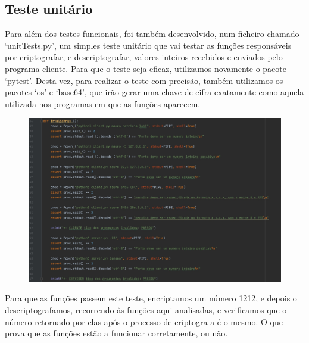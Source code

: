 \documentclass{report}
\begin{document}
\subsection{Teste unitário}
Para além dos testes funcionais, foi também desenvolvido, num ficheiro chamado ‘unitTests.py’, um simples teste unitário que vai testar as funções responsáveis por criptografar, e descriptografar, valores inteiros recebidos e enviados pelo programa cliente.
Para que o teste seja eficaz, utilizamos novamente o pacote ‘pytest’. Desta vez, para realizar o teste com precisão, também utilizamos os pacotes ‘os’ e ‘base64’, que irão gerar uma chave de cifra exatamente como aquela utilizada nos programas em que as funções aparecem.
\begin{figure}[H]
        \centering
        \includegraphics[scale=0.20]{testefuncional1}      
\end{figure}
Para que as funções passem este teste, encriptamos um número 1212, e depois o descriptografamos, recorrendo às funções aqui analisadas, e verificamos que o número retornado por elas após o processo de criptogra a é o mesmo. O que prova que as funções estão a
funcionar corretamente, ou não.
\end{document}
